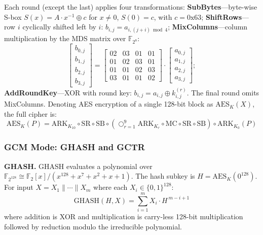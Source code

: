 \documentclass[11pt,a4paper]{article}
\newcommand{\F}{\mathbb{F}}
\newcommand{\xor}{\oplus}
\newcommand{\concat}{\mathbin{\|}}
\newcommand{\GHASH}{\text{GHASH}}
\newcommand{\AES}{\text{AES}}
\begin{document}
Each round (except the last) applies four transformations: \textbf{SubBytes}---byte-wise S-box $S(x) = A \cdot x^{-1} \xor c$ for $x \neq 0$, $S(0) = c$, with $c = 0\text{x}63$; \textbf{ShiftRows}---row $i$ cyclically shifted left by $i$: $b_{i,j} = a_{i,(j+i)\bmod 4}$; \textbf{MixColumns}---column multiplication by the MDS matrix over $\F_{2^8}$:
\begin{equation}
\begin{bmatrix} b_{0,j} \\ b_{1,j} \\ b_{2,j} \\ b_{3,j} \end{bmatrix} = \begin{bmatrix} 02 & 03 & 01 & 01 \\ 01 & 02 & 03 & 01 \\ 01 & 01 & 02 & 03 \\ 03 & 01 & 01 & 02 \end{bmatrix} \cdot \begin{bmatrix} a_{0,j} \\ a_{1,j} \\ a_{2,j} \\ a_{3,j} \end{bmatrix};
\end{equation}
\textbf{AddRoundKey}---XOR with round key: $b_{i,j} = a_{i,j} \xor k^{(r)}_{i,j}$. The final round omits MixColumns. Denoting AES encryption of a single 128-bit block as $\AES_K(X)$, the full cipher is:
\begin{equation}
\AES_K(P) = \text{ARK}_{K_{10}} \circ \text{SR} \circ \text{SB} \circ \left( \bigcirc_{r=1}^{9} \text{ARK}_{K_r} \circ \text{MC} \circ \text{SR} \circ \text{SB} \right) \circ \text{ARK}_{K_0}(P)
\end{equation}

\subsubsection{GCM Mode: GHASH and GCTR}

\textbf{GHASH.} GHASH evaluates a polynomial over $\F_{2^{128}} \cong \F_2[x]/(x^{128} + x^7 + x^2 + x + 1)$. The hash subkey is $H = \AES_K(0^{128})$. For input $X = X_1 \concat \cdots \concat X_m$ where each $X_i \in \{0,1\}^{128}$:
\begin{equation}
\GHASH(H, X) = \sum_{i=1}^{m} X_i \cdot H^{\,m-i+1}
\end{equation}
where addition is XOR and multiplication is carry-less 128-bit multiplication followed by reduction modulo the irreducible polynomial.
\end{document}
